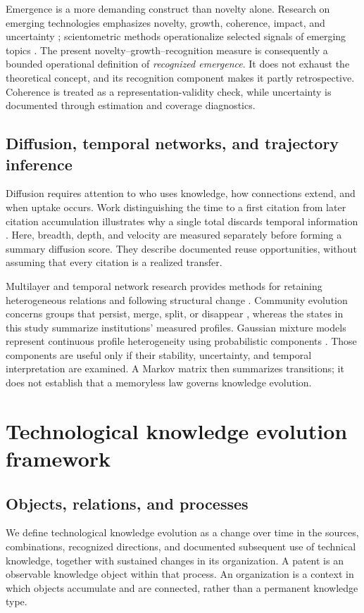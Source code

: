 Emergence is a more demanding construct than novelty alone. Research on emerging
technologies emphasizes novelty, growth, coherence, impact, and uncertainty
\citep{rotolo2015}; scientometric methods operationalize selected signals of
emerging topics \citep{small2014}. The present novelty--growth--recognition measure
is consequently a bounded operational definition of \emph{recognized emergence}.
It does not exhaust the theoretical concept, and its recognition component makes
it partly retrospective. Coherence is treated as a representation-validity check,
while uncertainty is documented through estimation and coverage diagnostics.

\subsection{Diffusion, temporal networks, and trajectory inference}
Diffusion requires attention to who uses knowledge, how connections extend, and
when uptake occurs. Work distinguishing the time to a first citation from later
citation accumulation illustrates why a single total discards temporal information
\citep{huang2019}. Here, breadth, depth, and velocity are measured separately before
forming a summary diffusion score. They describe documented reuse opportunities,
without assuming that every citation is a realized transfer.

Multilayer and temporal network research provides methods for retaining heterogeneous
relations and following structural change \citep{kivela2014,boccaletti2014,mucha2010}.
Community evolution concerns groups that persist, merge, split, or disappear
\citep{palla2007}, whereas the states in this study summarize institutions' measured
profiles. Gaussian mixture models represent continuous profile heterogeneity using
probabilistic components \citep{fraley2002,scrucca2016}. Those components are useful
only if their stability, uncertainty, and temporal interpretation are examined.
A Markov matrix then summarizes transitions; it does not establish that a
memoryless law governs knowledge evolution.

\section{Technological knowledge evolution framework}\label{sec:framework}
\subsection{Objects, relations, and processes}
We define technological knowledge evolution as a change over time in the sources,
combinations, recognized directions, and documented subsequent use of technical
knowledge, together with sustained changes in its organization. A patent is an
observable knowledge object within that process. An organization is a context in
which objects accumulate and are connected, rather than a permanent knowledge type.

